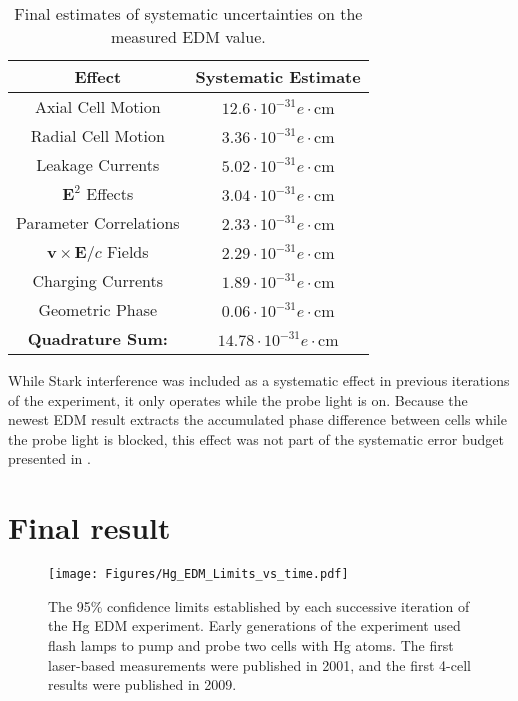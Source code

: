 \documentclass [10pt, twoside] {uwthesis}[2012/04/02]
\begin{document}
\begin{table}	
\begin{center}
\caption[Systematic error budget]%
{\narrower Final estimates of systematic uncertainties on the measured EDM value.}
\label{Systematics} 
\begin{tabular}{cc}	
\hline \hline
Effect & Systematic Estimate \\
\hline	
Axial Cell Motion 						& $12.6 \cdot 10^{-31} e\cdot \text{cm}$ \\
Radial Cell Motion 						& $3.36 \cdot 10^{-31} e\cdot \text{cm}$ \\
Leakage Currents						& $5.02 \cdot 10^{-31} e\cdot \text{cm}$ \\
$\mathbf{E}^2$ Effects					& $3.04 \cdot 10^{-31} e\cdot \text{cm}$ \\
Parameter Correlations					& $2.33 \cdot 10^{-31} e\cdot \text{cm}$ \\
$\mathbf{v}\times\mathbf{E}/c$ Fields	& $2.29 \cdot 10^{-31} e\cdot \text{cm}$ \\
Charging Currents						& $1.89 \cdot 10^{-31} e\cdot \text{cm}$ \\
Geometric Phase							& $0.06 \cdot 10^{-31} e\cdot \text{cm}$ \\
\hline
\textbf{Quadrature Sum:}				& $14.78 \cdot 10^{-31} e\cdot \text{cm}$ \\
\hline \hline
\end{tabular} 
\end{center}
\end{table}

While Stark interference was included as a systematic effect in previous iterations of the experiment, it only operates while the probe light is on. Because the newest EDM result extracts the accumulated phase difference between cells while the probe light is blocked, this effect was not part of the systematic error budget presented in \cite{2016_Hg_EDM}.

\section{Final result}

\begin{figure}
\begin{center}
\texttt{[image: Figures/Hg\_EDM\_Limits\_vs\_time.pdf]}
\end{center}
\caption[$^{199}$Hg EDM limits vs. time]%
{\narrower The 95\% confidence limits established by each successive iteration of the Hg EDM experiment. Early generations of the experiment used flash lamps to pump and probe two cells with Hg atoms. The first laser-based measurements were published in 2001, and the first 4-cell results were published in 2009.}
\label{Limits_vs_time}
\end{figure}	
\end{document}
